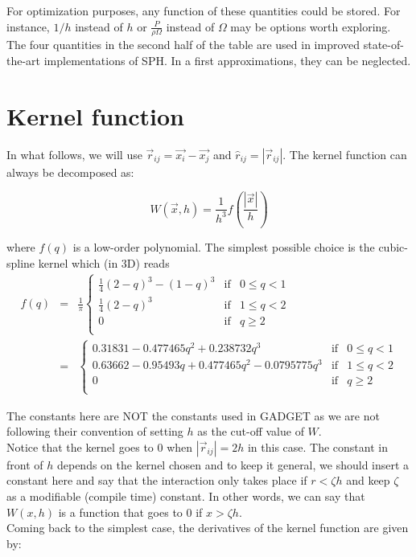 \documentclass[a4paper,10pt]{article}
\begin{document}
For optimization purposes, any function of these quantities could be stored. For instance, $1/h$ instead of $h$ or
$\frac{P}{\rho\Omega}$ instead of $\Omega$ may be options worth exploring. \\

The four quantities in the second half of the table are used in improved state-of-the-art implementations of SPH. In a
first approximations, they can be neglected.

\section{Kernel function}

In what follows, we will use $\vec{r}_{ij} = \vec{x_i} - \vec{x_j}$ and $\hat{r}_{ij} = |\vec{r}_{ij}|$. The kernel
function can always be decomposed as:

\begin{equation}
 W(\vec{x}, h) = \frac{1}{h^3}f\left(\frac{|\vec{x}|}{h}\right) 
\end{equation}

where $f(q)$ is a low-order polynomial. The simplest possible choice is the cubic-spline kernel which (in 3D) reads
\begin{eqnarray*}
 f(q) &=& \frac{1}{\pi}\left\lbrace \begin{array}{rcl}
                      \frac{1}{4}(2-q)^3 - (1-q)^3 & \mbox{if} & 0 \leq q < 1 \\
		      \frac{1}{4}(2-q)^3 & \mbox{if} & 1 \leq q < 2 \\
		      0 & \mbox{if} & q \geq 2 \\
                     \end{array}
 \right. \\
&=&\left\lbrace \begin{array}{rcl}
    0.31831 -0.477465 q^2+0.238732 q^3& \mbox{if} & 0 \leq q < 1 \\
   0.63662 -0.95493 q+0.477465 q^2-0.0795775 q^3  & \mbox{if} & 1 \leq q < 2 \\
		      0 & \mbox{if} & q \geq 2 \\
                     \end{array}
 \right.
\end{eqnarray*}

The constants here are NOT the constants used in GADGET as we are not following their convention of setting $h$ as the
cut-off value of $W$.\\
Notice that the kernel goes to $0$ when $|\vec{r}_{ij}| = 2h$ in this case. The constant in front of $h$ depends on the
kernel
chosen and to keep it general, we should insert a constant here and say that the interaction only takes place if
$r<\zeta h$ and keep $\zeta$ as a modifiable (compile time) constant. In other words, we can say that $W(x,h)$ is a
function that goes to $0$ if $x > \zeta h$. \\
Coming back to the simplest case, the derivatives of the kernel function are given by:
\end{document}
